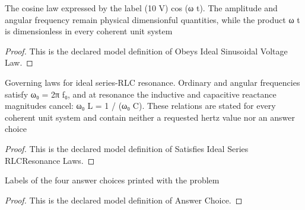 \begin{definition}
  \label{def:physics:phyx-mini-0889:phyxminiproblems-problemphyxmini0889-obeysidealsinusoidalvoltagelaw}
  The cosine law expressed by the label (10 V) cos (ω t). The amplitude and angular frequency remain physical dimensionful quantities, while the product ω t is dimensionless in every coherent unit system
\end{definition}
\begin{proof}
  This is the declared model definition of Obeys Ideal Sinusoidal Voltage Law.
\end{proof}
\begin{definition}
  \label{def:physics:phyx-mini-0889:phyxminiproblems-problemphyxmini0889-satisfiesidealseriesrlcresonancelaws}
  Governing laws for ideal series-RLC resonance. Ordinary and angular frequencies satisfy ω₀ = 2π f₀, and at resonance the inductive and capacitive reactance magnitudes cancel: ω₀ L = 1 / (ω₀ C). These relations are stated for every coherent unit system and contain neither a requested hertz value nor an answer choice
\end{definition}
\begin{proof}
  This is the declared model definition of Satisfies Ideal Series RLCResonance Laws.
\end{proof}
\begin{definition}
  \label{def:physics:phyx-mini-0889:phyxminiproblems-problemphyxmini0889-answerchoice}
  Labels of the four answer choices printed with the problem
\end{definition}
\begin{proof}
  This is the declared model definition of Answer Choice.
\end{proof}
